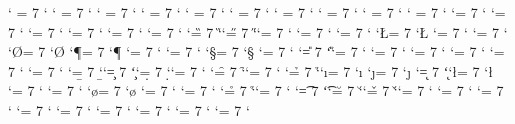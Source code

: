 \Umathcode `\0 = 7 \mrmfam `\0 %
\Umathcode `\1 = 7 \mrmfam `\1 %
\Umathcode `\2 = 7 \mrmfam `\2 %
\Umathcode `\3 = 7 \mrmfam `\3 %
\Umathcode `\4 = 7 \mrmfam `\4 %
\Umathcode `\5 = 7 \mrmfam `\5 %
\Umathcode `\6 = 7 \mrmfam `\6 %
\Umathcode `\7 = 7 \mrmfam `\7 %
\Umathcode `\8 = 7 \mrmfam `\8 %
\Umathcode `\9 = 7 \mrmfam `\9 %
\Umathcode `\A = 7 \mitfam `\A %
\Umathcode `\B = 7 \mitfam `\B %
\Umathcode `\C = 7 \mitfam `\C %
\Umathcode `\D = 7 \mitfam `\D %
\Umathcode `\E = 7 \mitfam `\E %
\Umathcode `\F = 7 \mitfam `\F %
\Umathcode `\G = 7 \mitfam `\G %
\Umathcode `\H = 7 \mitfam `\H %
\Umathcode `\I = 7 \mitfam `\I %
\Umathcode `\J = 7 \mitfam `\J %
\Umathcode `\K = 7 \mitfam `\K %
\Umathcode `\L = 7 \mitfam `\L %
\Umathcode `\M = 7 \mitfam `\M %
\Umathcode `\N = 7 \mitfam `\N %
\Umathcode `\O = 7 \mitfam `\O %
\Umathcode `\P = 7 \mitfam `\P %
\Umathcode `\Q = 7 \mitfam `\Q %
\Umathcode `\R = 7 \mitfam `\R %
\Umathcode `\S = 7 \mitfam `\S %
\Umathcode `\T = 7 \mitfam `\T %
\Umathcode `\U = 7 \mitfam `\U %
\Umathcode `\V = 7 \mitfam `\V %
\Umathcode `\W = 7 \mitfam `\W %
\Umathcode `\X = 7 \mitfam `\X %
\Umathcode `\Y = 7 \mitfam `\Y %
\Umathcode `\Z = 7 \mitfam `\Z %
\Umathcode `\a = 7 \mitfam `\a %
\Umathcode `\b = 7 \mitfam `\b %
\Umathcode `\c = 7 \mitfam `\c %
\Umathcode `\d = 7 \mitfam `\d %
\Umathcode `\e = 7 \mitfam `\e %
\Umathcode `\f = 7 \mitfam `\f %
\Umathcode `\g = 7 \mitfam `\g %
\Umathcode `\h = 7 \mitfam `\h %
\Umathcode `\i = 7 \mitfam `\i %
\Umathcode `\j = 7 \mitfam `\j %
\Umathcode `\k = 7 \mitfam `\k %
\Umathcode `\l = 7 \mitfam `\l %
\Umathcode `\m = 7 \mitfam `\m %
\Umathcode `\n = 7 \mitfam `\n %
\Umathcode `\o = 7 \mitfam `\o %
\Umathcode `\p = 7 \mitfam `\p %
\Umathcode `\q = 7 \mitfam `\q %
\Umathcode `\r = 7 \mitfam `\r %
\Umathcode `\s = 7 \mitfam `\s %
\Umathcode `\t = 7 \mitfam `\t %
\Umathcode `\u = 7 \mitfam `\u %
\Umathcode `\v = 7 \mitfam `\v %
\Umathcode `\w = 7 \mitfam `\w %
\Umathcode `\x = 7 \mitfam `\x %
\Umathcode `\y = 7 \mitfam `\y %
\Umathcode `\z = 7 \mitfam `\z %
\Umathcode `\Α = 7 \mrmfam `\Α %
\Umathcode `\Β = 7 \mrmfam `\Β %
\Umathcode `\Γ = 7 \mrmfam `\Γ %
\Umathcode `\Δ = 7 \mrmfam `\Δ %
\Umathcode `\Ε = 7 \mrmfam `\Ε %
